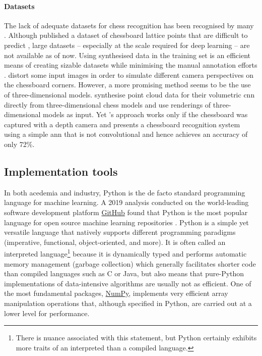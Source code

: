 \paragraph{Datasets}
The lack of adequate datasets for chess recognition has been recognised by many \cite{czyzewski2020,ding2016,mehta2020}.
Although \textcite{czyzewski2020} published a dataset of chessboard lattice points that are difficult to predict \cite{czyzewski2018}, large datasets -- especially at the scale required for deep learning -- are not available as of now.
Using synthesised data in the training set is an efficient means of creating sizable datasets while minimising the manual annotation efforts \cite{wei2017,hou,czyzewski2020}.
\citeauthor{czyzewski2020} distort some input images in order to simulate different camera perspectives on the chessboard corners.
However, a more promising method seems to be the use of three-dimensional models.
\textcite{wei2017} synthesise point cloud data for their volumetric \gls{cnn} directly from three-dimensional chess models and \textcite{hou} use renderings of three-dimensional models as input. 
Yet \textcite{wei2017}'s approach works only if the chessboard was captured with a depth camera and \textcite{hou} presents a chessboard recognition system using a simple \gls{ann} that is not convolutional and hence achieves an accuracy of only 72\%.

\subsection{Implementation tools}
\label{sec:implementation_tools}
In both acedemia and industry, Python is the de facto standard programming language for machine learning. 
A 2019 analysis conducted on the world-leading software development platform \href{https://www.github.com/}{GitHub} found that Python is the most popular language for open source machine learning repositories \cite{elliott2019}.
Python is a simple yet versatile language that natively supports different programming paradigms (imperative, functional, object-oriented, and more).
It is often called an interpreted language\footnote{There is nuance associated with this statement, but Python certainly exhibits more traits of an interpreted than a compiled language.} because it is dynamically typed and performs automatic memory management (garbage collection) which generally facilitates shorter code than compiled languages such as C or Java, but also means that pure-Python implementations of data-intensive algorithms are usually not as efficient.
One of the most fundamental packages, \href{https://numpy.org/}{NumPy}, implements very efficient array manipulation operations that, although specified in Python, are carried out at a lower level for performance.

